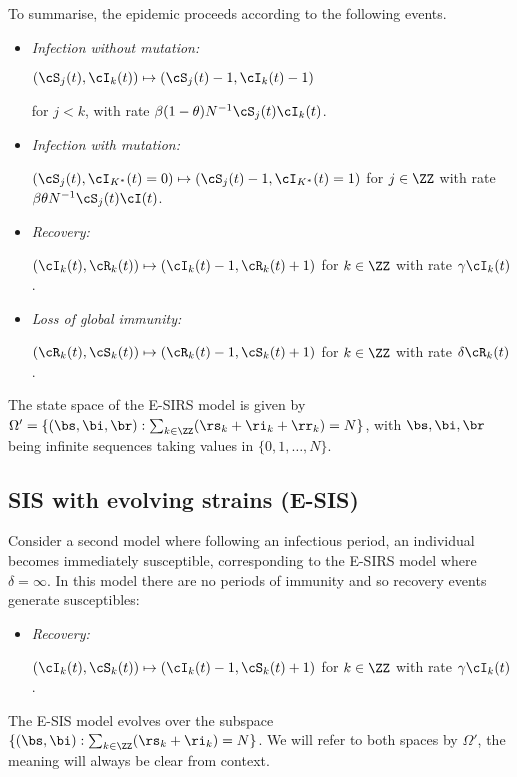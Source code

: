 \documentclass[smallextended]{svjour3}       %
\begin{document}
To summarise, the epidemic proceeds according to the following events. 

\begin{itemize}
	\item \emph{Infection without mutation:} 
	
		$(\cS_j(t), \cI_k(t)) \mapsto (\cS_j(t) -1, \cI_k(t) -1)$

	for $j < k$, with rate $\beta(1-\theta) N^{-1} \cS_j(t)\cI_k(t)$.
	\item \emph{Infection with mutation:}
	
		$(\cS_j(t), \cI_{K^*}(t)=0) \mapsto (\cS_j(t)-1, \cI_{K^*}(t)=1)$
	for $j \in \ZZ$ with rate $\beta \theta N^{-1} \cS_j(t) \cI(t)$.
	\item \emph{Recovery:}
	
		$(\cI_k(t), \cR_k(t)) \mapsto (\cI_k(t) - 1, \cR_k(t) +1)$
	for $k \in \ZZ$ with rate $\gamma \cI_k(t)$.
	\item \emph{Loss of global immunity:}

		$(\cR_k(t), \cS_k(t)) \mapsto (\cR_k(t) -1, \cS_k(t) + 1)$
	for $k \in \ZZ$ with rate $\delta \cR_k(t)$.
\end{itemize}

The state space of the E-SIRS model is given by $\Omega'= \{ (\bs, \bi, \br): \sum_{k \in \ZZ} (\rs_k + \ri_k + \rr_k) = N \}$, with $\bs, \bi, \br$ being infinite sequences taking values in $\{0,1,\dots,N\}$. 

\subsection{SIS with evolving strains (E-SIS)}\label{subsec: sis}
Consider a second model where
following an infectious period, 
an individual becomes immediately susceptible, corresponding to the E-SIRS model where $\delta = \infty$.
In this model there are no periods of immunity and so recovery events generate susceptibles:
	
	
 \begin{itemize}
 	\item \emph{Recovery:}
 	
 		$(\cI_k(t), \cS_{k}(t)) \mapsto (\cI_k(t) - 1, \cS_{k}(t) +1)$
 	for $k \in \ZZ$ with rate $\gamma \cI_k(t)$.
 \end{itemize}
The E-SIS model evolves over the subspace $\{ (\bs, \bi): \sum_{k \in \ZZ} (\rs_k + \ri_k) = N  \}$. We will refer to both spaces by $\Omega'$, the meaning will always be clear from context.
\end{document}
